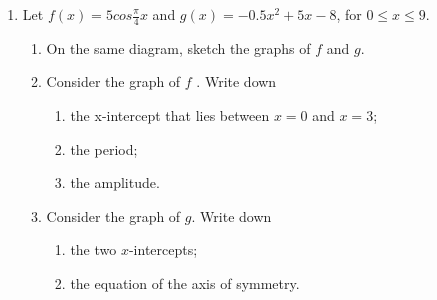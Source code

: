 \documentclass{article}
\begin{document}
\begin{enumerate}
\item Let $\displaystyle f(x) = 5cos \frac{\pi}{4} x$ and $g(x) = −0.5x^2 + 5x −8$, for $0 \leq x \leq 9$.
\begin{enumerate}
\item On the same diagram, sketch the graphs of $f$ and $g$.
\item Consider the graph of $f$ . Write down
\begin{enumerate}
\item the x-intercept that lies between $x = 0$ and $x = 3$;
\item the period;
\item the amplitude.
\end{enumerate}
\item Consider the graph of $g$. Write down
\begin{enumerate}
\item the two $x$-intercepts;
\item the equation of the axis of symmetry.
\end{enumerate}
\end{enumerate}

\end{enumerate}


\begin{figure}[!htbp]
\begin{center}
\end{center}
\end{figure}
\end{document}
